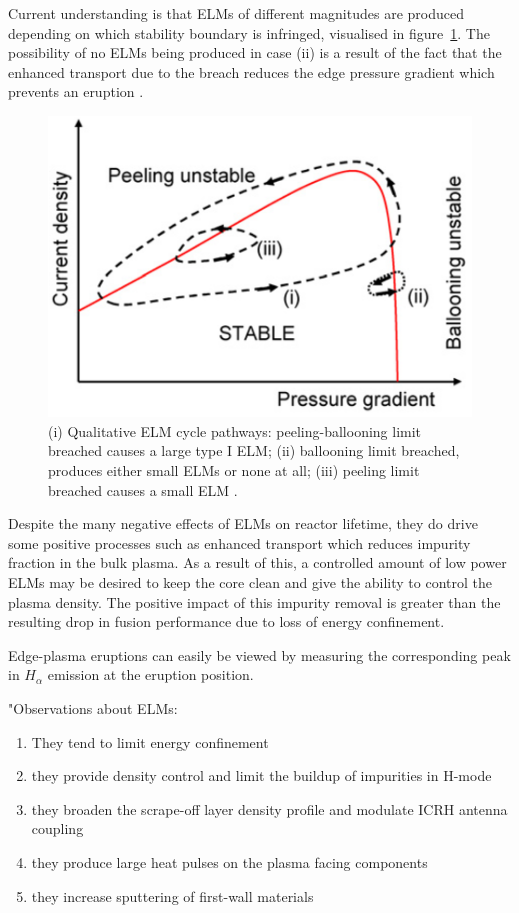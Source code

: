 \documentclass[12pt]{article}  %
\newcommand{\citep}[1]{\cite{#1}}
\begin{document}
Current understanding is that ELMs of different magnitudes are produced depending on which stability boundary is infringed, visualised in figure~\ref{fig:ELMcycles}. The possibility of no ELMs being produced in case (ii) is a result of the fact that the enhanced transport due to the breach reduces the edge pressure gradient which prevents an eruption \cite{Wilson2006}.

\begin{figure}
\includegraphics[scale=0.6]{Figures/ELMcycles.png}
\centering
\caption{(i) Qualitative ELM cycle pathways: peeling-ballooning limit breached causes a large type I ELM; (ii) ballooning limit breached, produces either small ELMs or none at all; (iii) peeling limit breached causes a small ELM \cite{Wilson2006}.}\label{fig:ELMcycles}
\end{figure}

Despite the many negative effects of ELMs on reactor lifetime, they do drive some positive processes such as enhanced transport which reduces impurity fraction in the bulk plasma. As a result of this, a controlled amount of low power ELMs may be desired to keep the core clean and give the ability to control the plasma density.\citep{Hill1997} The positive impact of this impurity removal is greater than the resulting drop in fusion performance due to loss of energy confinement.\cite{Connor2008}



Edge-plasma eruptions can easily be viewed by measuring the corresponding peak in $H_{\alpha}$ emission at the eruption position.\citep{Hill1997}

"Observations about ELMs: 
\begin{enumerate}
\item They tend to limit energy confinement
\item they provide density control and limit the buildup of impurities in H-mode
\item they broaden the scrape-off layer density profile and modulate ICRH antenna coupling
\item they produce large heat pulses on the plasma facing components 
\item they increase sputtering of first-wall materials
\end{enumerate}
\end{document}
